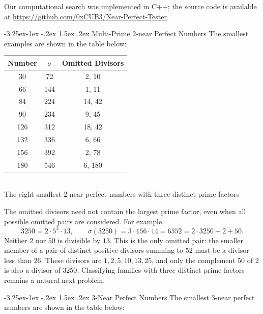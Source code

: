 \documentclass[10pt]{article}
\makeatletter
\renewcommand\subsection{\@startsection{subsection}{2}{\z@}
{-3.25ex\@plus -1ex \@minus -.2ex}
{1.5ex \@plus .2ex}
{\normalfont\normalsize\bfseries\boldmath}}
\theoremstyle{definition}
\makeatother
\begin{document}
Our computational search was implemented in C++; the source code is available at \url{https://github.com/0xCUB3/Near-Perfect-Tester}.

\subsection{Multi-Prime $2$-near Perfect Numbers}
The smallest examples are shown in the table below:

\begin{table}[htbp]
\begin{center}
\begin{tabular}{|c|c|c|}
\hline
Number & $\sigma$ & Omitted Divisors \\
\hline
30 & 72 & 2, 10 \\
66 & 144 & 1, 11 \\
84 & 224 & 14, 42 \\
90 & 234 & 9, 45 \\
126 & 312 & 18, 42 \\
132 & 336 & 6, 66 \\
156 & 392 & 2, 78 \\
180 & 546 & 6, 180 \\
\hline
\end{tabular}
\\[2mm]
\small{The eight smallest $2$-near perfect numbers with three distinct prime factors}
\end{center}
\end{table}

The omitted divisors need not contain the largest prime factor,
even when all possible omitted pairs are considered. For example,
\[
3250=2\cdot5^3\cdot13,\qquad
\sigma(3250)=3\cdot156\cdot14=6552=2\cdot3250+2+50.
\]
Neither $2$ nor $50$ is divisible by $13$. This is the only omitted
pair: the smaller member of a pair of distinct positive divisors
summing to $52$ must be a divisor less than $26$. These divisors are
$1,2,5,10,13,25$, and only the complement $50$ of $2$ is also a
divisor of $3250$. Classifying families with three distinct prime
factors remains a natural next problem.



\subsection{$3$-Near Perfect Numbers}
The smallest $3$-near perfect numbers are shown in the table below:
\end{document}
